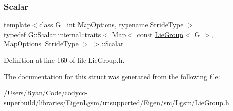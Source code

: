 \subsubsection{\texorpdfstring{Scalar}{Scalar}}
{\footnotesize\ttfamily template$<$class G , int Map\+Options, typename Stride\+Type $>$ \\
typedef G\+::\+Scalar internal\+::traits$<$ Map$<$ const \hyperlink{class_lie_group}{Lie\+Group}$<$ G $>$, Map\+Options, Stride\+Type $>$ $>$\+::\hyperlink{structinternal_1_1traits_3_01_map_3_01const_01_lie_group_3_01_g_01_4_00_01_map_options_00_01_stride_type_01_4_01_4_a3aab625ff94db50623851510a4420ab0}{Scalar}}



Definition at line 160 of file Lie\+Group.\+h.



The documentation for this struct was generated from the following file\+:\begin{DoxyCompactItemize}
\item 
/\+Users/\+Ryan/\+Code/codyco-\/superbuild/libraries/\+Eigen\+Lgsm/unsupported/\+Eigen/src/\+Lgsm/\hyperlink{_lie_group_8h}{Lie\+Group.\+h}\end{DoxyCompactItemize}
